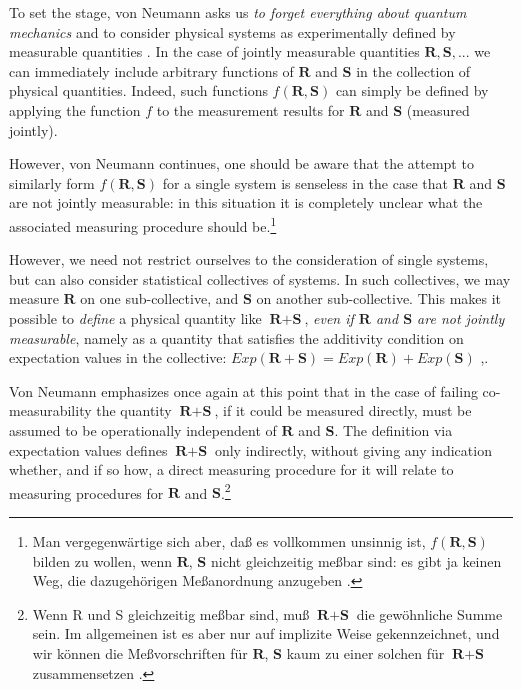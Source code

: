 \documentclass[12pt]{article}
\begin{document}
To set the stage, von Neumann asks us \emph{to forget everything about quantum mechanics} and to consider physical systems as experimentally defined by measurable quantities \cite[p.\@ 158]{VN1}. In the case of jointly measurable quantities $ \textbf{R}, \textbf{S},...$ we can immediately include arbitrary functions of $\textbf{R}$ and $\textbf{S}$ in the collection of physical quantities. Indeed, such functions $f(\textbf{R},\textbf{S})$ can simply be defined by applying the function $f$ to the measurement results for $\textbf{R}$ and $\textbf{S}$ (measured jointly).

However, von Neumann continues, one should be aware that the attempt to similarly form $f(\textbf{R},\textbf{S})$ for a single system is senseless in the case that $\textbf{R}$ and $\textbf{S}$ are not jointly measurable: in this situation it is completely unclear what the associated measuring procedure should be.\footnote{Man vergegenw\"{a}rtige sich aber, da{\ss} es vollkommen unsinnig ist, $f(\textbf{R},\textbf{S})$ bilden zu wollen, wenn $\textbf{R}$, $\textbf{S}$ nicht gleichzeitig me{\ss}bar sind: es gibt ja keinen Weg, die dazugeh\"{o}rigen Me{\ss}anordnung anzugeben \cite[p.\@ 158]{VN1}.}

However, we need not restrict ourselves to the consideration of single systems, but can also consider statistical collectives of systems. In such collectives, we may measure $\textbf{R}$ on one sub-collective, and $\textbf{S}$ on another sub-collective. This makes it possible to \emph{define} a physical quantity like $\textbf{R} + \textbf{S}$, \emph{even if $\textbf{R}$ and $\textbf{S}$ are not jointly measurable}, namely as a quantity that satisfies the additivity condition on expectation values in the collective: $Exp(\textbf{R}+\textbf{S}) = Exp(\textbf{R}) + Exp(\textbf{S})$ \cite[p.\@ 164]{VN1},\cite{bub}.

Von Neumann emphasizes once again at this point that in the case of failing co-measurability the quantity $\textbf{R}+\textbf{S}$, if it could be measured directly, must be assumed to be operationally independent of $\textbf{R}$ and $\textbf{S}$. The definition via expectation values defines $\textbf{R} + \textbf{S}$ only indirectly, without giving any indication whether, and if so how, a direct measuring procedure for it will relate to measuring procedures for $\textbf{R}$ and $\textbf{S}$.\footnote{Wenn R und S gleichzeitig me{\ss}bar sind, mu{\ss} $\textbf{R} + \textbf{S}$ die gew\"{o}hnliche Summe sein. Im allgemeinen ist es aber nur auf implizite Weise gekennzeichnet, und wir k\"{o}nnen die Me{\ss}vorschriften f\"{u}r $\textbf{R}$, $\textbf{S}$ kaum zu einer solchen f\"{u}r $\textbf{R} + \textbf{S}$ zusammensetzen \cite[p.\@ 164]{VN1}.}
\end{document}
